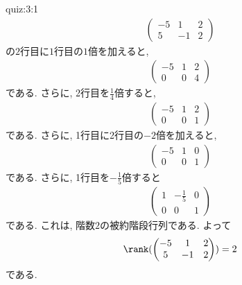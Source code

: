 \begin{answerof}{quiz:3:1}
  \begin{align*}
    \begin{pmatrix}
      -5&1&2\\5&-1&2
    \end{pmatrix}
  \end{align*}
  の$2$行目に$1$行目の$1$倍を加えると,
  \begin{align*}
    \begin{pmatrix}
      -5&1&2\\0&0&4
    \end{pmatrix}
  \end{align*}
  である. さらに, 
  2行目を$\frac{1}{4}$倍すると,
  \begin{align*}
    \begin{pmatrix}
      -5&1&2\\0&0&1
    \end{pmatrix}
  \end{align*}
  である. さらに,
  1行目に2行目の$-2$倍を加えると,
  \begin{align*}
    \begin{pmatrix}
      -5&1&0\\0&0&1
    \end{pmatrix}
  \end{align*}
  である. さらに,
  1行目を$-\frac{1}{5}$倍すると
  \begin{align*}
    \begin{pmatrix}
      1&-\frac{1}{5}&0\\0&0&1
    \end{pmatrix}
  \end{align*}
  である.
  これは, 階数$2$の被約階段行列である.
  よって
  \begin{align*}
    \rank(
    \begin{pmatrix}
      -5&1&2\\5&-1&2
    \end{pmatrix}
    )=2
  \end{align*}
  である.



\end{answerof}
